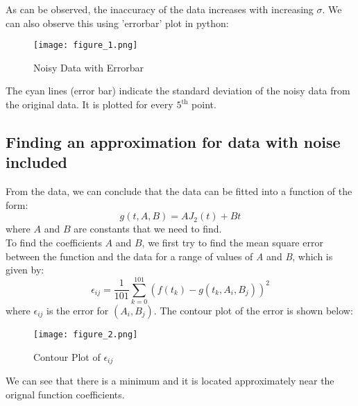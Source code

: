 \documentclass[11pt, a4paper]{article}
\begin{document}
            As can be observed, the inaccuracy of the data increases with increasing $\sigma$. We can also observe this using 'errorbar' plot in python:
            \begin{figure}[H]
                \centering
                \texttt{[image: figure\_1.png]}
                \caption{Noisy Data with Errorbar}
                \label{fig:figure_1}
            \end{figure}

            The cyan lines (error bar) indicate the standard deviation of the noisy data from the original data. It is plotted for every $5^\text{th}$ point.

        \subsection{Finding an approximation for data with noise included}
            From the data, we can conclude that the data can be fitted into a function of the form:
            \begin{equation}
                g(t, A, B) = AJ_2(t)+Bt
            \end{equation}
            where $A$ and $B$ are constants that we need to find.\\

            To find the coefficients $A$ and $B$, we first try to find the mean square error between the function and the data for a range of values of \textit{A} and \textit{B}, which is given by:
            \begin{equation}
                \epsilon_{ij} = \frac{1}{101}\sum_{k=0}^{101}(f(t_k) - g(t_k, A_i, B_j))^2
            \end{equation}
            where $\epsilon_{ij}$ is the error for $(A_i,B_j)$. The contour plot of the error is shown below:
            \begin{figure}[H]
                \centering
                \texttt{[image: figure\_2.png]} 
                \caption{Contour Plot of $\epsilon_{ij}$}
                \label{fig:figure_2}
            \end{figure}

            We can see that there is a minimum and  it is located approximately near the orignal function coefficients.\\
\end{document}
